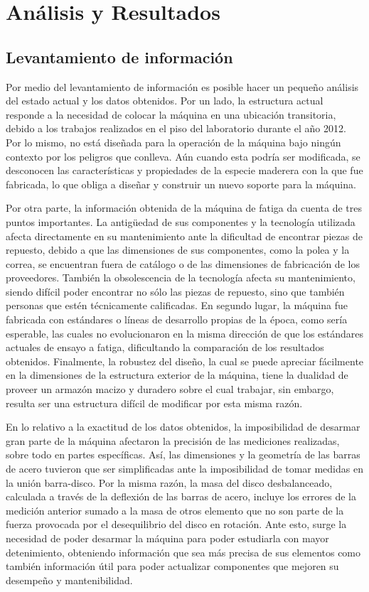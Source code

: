 \chapter{Análisis y Resultados}

\section{Levantamiento de información}
Por medio del levantamiento de información es posible hacer un pequeño análisis del estado actual y los datos obtenidos. Por un lado, la estructura actual responde a la necesidad de colocar la máquina en una ubicación transitoria, debido a los trabajos realizados en el piso del laboratorio durante el año 2012. Por lo mismo, no está diseñada para la operación de la máquina bajo ningún contexto por los peligros que conlleva. Aún cuando esta podría ser modificada, se desconocen las características y propiedades de la especie maderera con la que fue fabricada, lo que obliga a diseñar y construir un nuevo soporte para la máquina. 

Por otra parte, la información obtenida de la máquina de fatiga da cuenta de tres puntos importantes. La antigüedad de sus componentes y la tecnología utilizada afecta directamente en su mantenimiento ante la dificultad de encontrar piezas de repuesto, debido a que las dimensiones de sus componentes, como la polea y la correa, se encuentran fuera de catálogo o de las dimensiones de fabricación de los proveedores. También la obsolescencia de la tecnología afecta su mantenimiento, siendo difícil poder encontrar no sólo las piezas de repuesto, sino que también personas que estén técnicamente calificadas. En segundo lugar, la máquina fue fabricada con estándares o líneas de desarrollo propias de la época, como sería esperable, las cuales no evolucionaron en la misma dirección de que los estándares actuales de ensayo a fatiga, dificultando la comparación de los resultados obtenidos. Finalmente, la robustez del diseño, la cual se puede apreciar fácilmente en la dimensiones de la estructura exterior de la máquina, tiene la dualidad de proveer un armazón macizo y duradero sobre el cual trabajar, sin embargo, resulta ser una estructura difícil de modificar por esta misma razón.

En lo relativo a la exactitud de los datos obtenidos, la imposibilidad de desarmar gran parte de la máquina afectaron la precisión de las mediciones realizadas, sobre todo en partes específicas. Así, las dimensiones y la geometría de las barras de acero tuvieron que ser simplificadas ante la imposibilidad de tomar medidas en la unión barra-disco. Por la misma razón, la masa del disco desbalanceado, calculada a través de la deflexión de las barras de acero, incluye los errores de la medición anterior sumado a la masa de otros elemento que no son parte de la fuerza provocada por el desequilibrio del disco en rotación. Ante esto, surge la necesidad de poder desarmar la máquina para poder estudiarla con mayor detenimiento, obteniendo información que sea más precisa de sus elementos como también información útil para poder actualizar componentes que mejoren su desempeño y mantenibilidad. 
 
